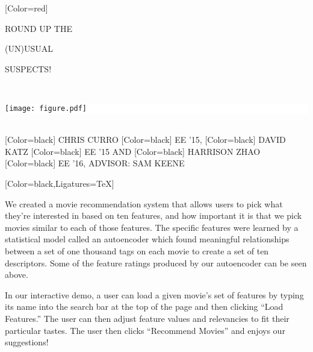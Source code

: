 \documentclass{article}
\begin{document}
\begin{minipage}[c]{28in}
{ 
[Color=red]
\fontsize{3.5in}{0.5in}\selectfont 
\bfseries





ROUND UP THE

\vspace{0.5in}

{ (UN)}USUAL 

\vspace{0.5in}

SUSPECTS!

}
\end{minipage}
\vspace{1in}\\
\colorbox{white}{
\begin{minipage}{28in}
\centering
\texttt{[image: figure.pdf]}
\end{minipage}
}
\vspace{1in}\\
{
[Color=black]
\fontsize{1in}{1em}\selectfont 
CHRIS CURRO
}
{
[Color=black]
\fontsize{0.8in}{1em}\selectfont 
EE '15,
}
{
[Color=black]
\fontsize{1in}{1em}\selectfont 
DAVID KATZ
}
{
[Color=black]
\fontsize{0.8in}{1em}\selectfont 
EE '15 AND
}
{
[Color=black]
\fontsize{1in}{1em}\selectfont 
HARRISON ZHAO
}
{
[Color=black]
\fontsize{0.8in}{1em}\selectfont 
EE '16, ADVISOR: SAM KEENE
}
\vspace{0.8in}\\
\begin{minipage}{15.5in}
{
	[Color=black,Ligatures=TeX]
	\fontsize{0.6in}{8em}\selectfont

	We created a movie recommendation system that allows users to pick what
	they're interested in based on ten features, and how important it is that we
	pick movies similar to each of those features. The specific features were
	learned by a statistical model called an autoencoder which found
	meaningful relationships between a set of one thousand tags on each movie
	to create a set of ten descriptors. Some of the feature ratings produced by
	our autoencoder can be seen above.

	\vspace{0.5in}
	\begin{hangpunct}
	In our interactive demo, a user can load a given movie's set of features by typing 
	its name into the search bar at the top of the page and then clicking
	``Load Features.'' The user can then adjust feature values and relevancies to fit
	their particular tastes. The user then clicks ``Recommend Movies'' and enjoys 
	our suggestions!
	\end{hangpunct}

}
\end{minipage} 
\end{document}
